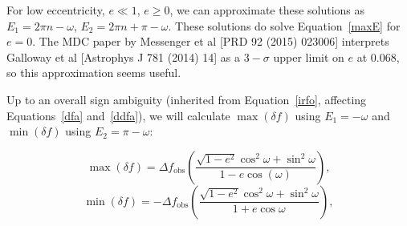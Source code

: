 \documentclass{article}
\begin{document}
\noindent For low eccentricity, $e \ll 1$, $e\geq 0$, we can approximate these solutions as $E_1 = 2\pi n - \omega$, $E_2 = 2\pi n + \pi - \omega$.
These solutions do solve Equation~\ref{maxE} for $e=0$.
The MDC paper by Messenger et al [PRD 92 (2015) 023006] interprets Galloway et al [Astrophys J 781 (2014) 14] as a $3-\sigma$ upper limit on $e$ at 0.068, so this approximation seems useful.

Up to an overall sign ambiguity (inherited from Equation~\ref{irfo}, affecting Equations~\ref{dfa} and~\ref{ddfa}), we will calculate $\max(\delta f)$ using $E_1 = -\omega$ and $\min(\delta f)$ using $E_2 = \pi-\omega$:

\begin{equation}
\max(\delta f) = \Delta f_\mathrm{obs} \left(\frac{\sqrt{1-e^2} \cos^2 \omega + \sin^2 \omega}{1-e \cos (\omega)} \right),
\label{maxdeltaf}
\end{equation}
\begin{equation}
\min(\delta f) = -\Delta f_\mathrm{obs} \left(\frac{\sqrt{1-e^2} \cos^2\omega + \sin^2 \omega}{1+e \cos \omega} \right),
\label{mindeltaf}
\end{equation}
\end{document}
